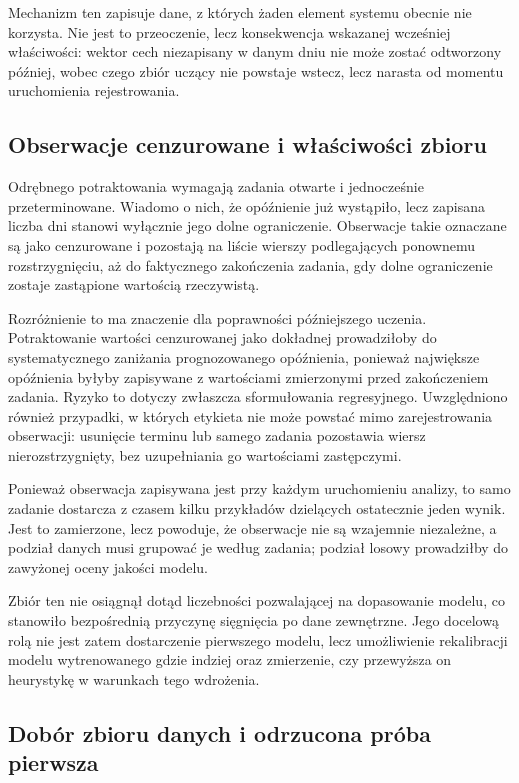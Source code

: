 Mechanizm ten zapisuje dane, z których żaden element systemu obecnie nie korzysta. Nie jest to przeoczenie, lecz konsekwencja wskazanej wcześniej właściwości: wektor cech niezapisany w danym dniu nie może zostać odtworzony później, wobec czego zbiór uczący nie powstaje wstecz, lecz narasta od momentu uruchomienia rejestrowania.

\subsection{Obserwacje cenzurowane i właściwości zbioru}

Odrębnego potraktowania wymagają zadania otwarte i jednocześnie przeterminowane. Wiadomo o nich, że opóźnienie już wystąpiło, lecz zapisana liczba dni stanowi wyłącznie jego dolne ograniczenie. Obserwacje takie oznaczane są jako cenzurowane i pozostają na liście wierszy podlegających ponownemu rozstrzygnięciu, aż do faktycznego zakończenia zadania, gdy dolne ograniczenie zostaje zastąpione wartością rzeczywistą.

Rozróżnienie to ma znaczenie dla poprawności późniejszego uczenia. Potraktowanie wartości cenzurowanej jako dokładnej prowadziłoby do systematycznego zaniżania prognozowanego opóźnienia, ponieważ największe opóźnienia byłyby zapisywane z wartościami zmierzonymi przed zakończeniem zadania. Ryzyko to dotyczy zwłaszcza sformułowania regresyjnego. Uwzględniono również przypadki, w których etykieta nie może powstać mimo zarejestrowania obserwacji: usunięcie terminu lub samego zadania pozostawia wiersz nierozstrzygnięty, bez uzupełniania go wartościami zastępczymi.

Ponieważ obserwacja zapisywana jest przy każdym uruchomieniu analizy, to samo zadanie dostarcza z czasem kilku przykładów dzielących ostatecznie jeden wynik. Jest to zamierzone, lecz powoduje, że obserwacje nie są wzajemnie niezależne, a podział danych musi grupować je według zadania; podział losowy prowadziłby do zawyżonej oceny jakości modelu.

Zbiór ten nie osiągnął dotąd liczebności pozwalającej na dopasowanie modelu, co stanowiło bezpośrednią przyczynę sięgnięcia po dane zewnętrzne. Jego docelową rolą nie jest zatem dostarczenie pierwszego modelu, lecz umożliwienie rekalibracji modelu wytrenowanego gdzie indziej oraz zmierzenie, czy przewyższa on heurystykę w warunkach tego wdrożenia.

\subsection{Dobór zbioru danych i odrzucona próba pierwsza}
\label{subsec:dobor-zbioru-danych}

